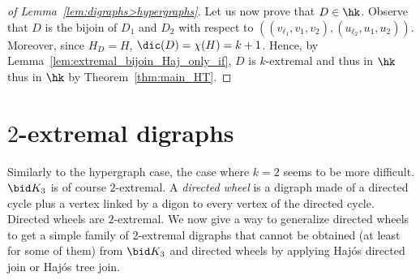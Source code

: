 \begin{proof}[of Lemma~\ref{lem:digraphs>hypergraphs}]
Let us now prove that $D \in \hk$.  
Observe that $D$ is the bijoin of $D_1$ and $D_2$ with respect to $((v_{\ell_1}, v_1, v_2), (u_{\ell_2}, u_1, u_2))$. Moreover, since  $H_D = H$, $\dic(D) = \chi(H) = k+1$.  Hence, by Lemma~\ref{lem:extremal_bijoin_Haj_only_if}, $D$ is $k$-extremal and thus in $\hk$ thus in $\hk$ by Theorem~\ref{thm:main_HT}.
  
\end{proof}





        



\section{$2$-extremal digraphs}

Similarly to the hypergraph case, the case where $k=2$ seems to be more difficult.  
$\bid K_3$ is of course $2$-extremal. 
A \emph{directed wheel} is a digraph made of a directed cycle plus a vertex linked by a digon to every vertex of the directed cycle. Directed wheels are $2$-extremal. We now give a way to generalize directed wheels to get a simple family of $2$-extremal digraphs that cannot be obtained (at least for some of them) from $\bid K_3$ and directed wheels by applying Haj\'os directed join or Haj\'os tree join. 

